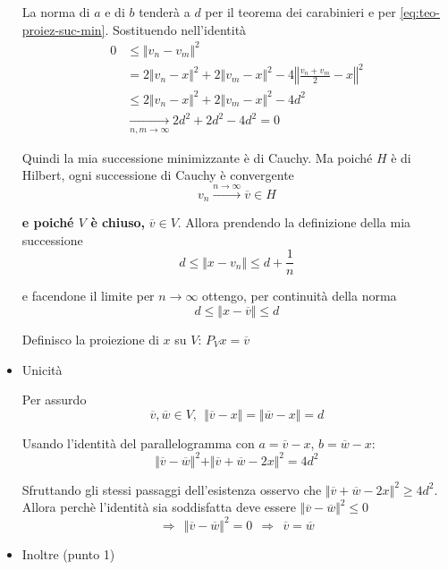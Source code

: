 \documentclass[10pt,a4paper,twoside,openright]{book}
\begin{document}
\begin{dimostrazione}
\begin{itemize}
		La norma di $a$ e di $b$ tenderà a $d$ per il teorema dei carabinieri e per \eqref{eq:teo-proiez-suc-min}. Sostituendo nell'identità\begin{align*}
		0 & \leqslant \Vert v_{n} -v_{m}\Vert ^{2}\\
		& =2\Vert v_{n} -x\Vert ^{2} +2\Vert v_{m} -x\Vert ^{2} -4\left\Vert \frac{v_{n} +v_{m}}{2} -x\right\Vert ^{2}\\
		& \leqslant 2\Vert v_{n} -x\Vert ^{2} +2\Vert v_{m} -x\Vert ^{2} -4d^{2}\\
		& \xrightarrow[n,m\rightarrow \infty ]{} 2d^{2} +2d^{2} -4d^{2} =0
		\end{align*}
		
		Quindi la mia successione minimizzante è di Cauchy. Ma poiché $H$ è di Hilbert, ogni successione di Cauchy è convergente\begin{equation*}
		v_{n}\xrightarrow{n\rightarrow \infty }\overline{v} \in H
		\end{equation*}
		
		\textbf{e poiché $V$ è chiuso,} $\overline{v} \in V$. Allora prendendo la definizione della mia successione \begin{equation*}
		d\leqslant \Vert x-v_{n}\Vert \leqslant d+\frac{1}{n}
		\end{equation*}
		
		e facendone il limite per $n\rightarrow \infty $ ottengo, per continuità della norma
		\begin{equation*}
			d\leqslant \Vert x-\overline{v}\Vert \leqslant d
		\end{equation*}
		
		Definisco la proiezione di $x$ su $V$: $\boxed{P_{V} x=\overline{v}}$
		\item Unicità
		      
		      Per assurdo\begin{equation*}
		      \overline{v},\overline{w} \in V,\ \ \Vert \overline{v} -x\Vert =\Vert \overline{w} -x\Vert =d
		\end{equation*}
		
		Usando l'identità del parallelogramma con $a=\overline{v} -x$, $b=\overline{w} -x$:\begin{equation*}
		\Vert \overline{v} -\overline{w}\Vert ^{2} +\Vert \overline{v} +\overline{w} -2x\Vert ^{2} =4d^{2}
		\end{equation*}
		
		Sfruttando gli stessi passaggi dell'esistenza osservo che $\Vert \overline{v} +\overline{w} -2x\Vert ^{2} \geqslant 4d^{2}$. Allora perchè l'identità sia soddisfatta deve essere $\Vert \overline{v} -\overline{w}\Vert ^{2} \leqslant 0$ \begin{equation*}
		\Rightarrow \ \ \Vert \overline{v} -\overline{w}\Vert ^{2} =0\ \ \Rightarrow \ \ \overline{v} =\overline{w}
		\end{equation*}
		\item Inoltre (punto 1)
		      

\end{itemize}
\end{dimostrazione}
\end{document}
